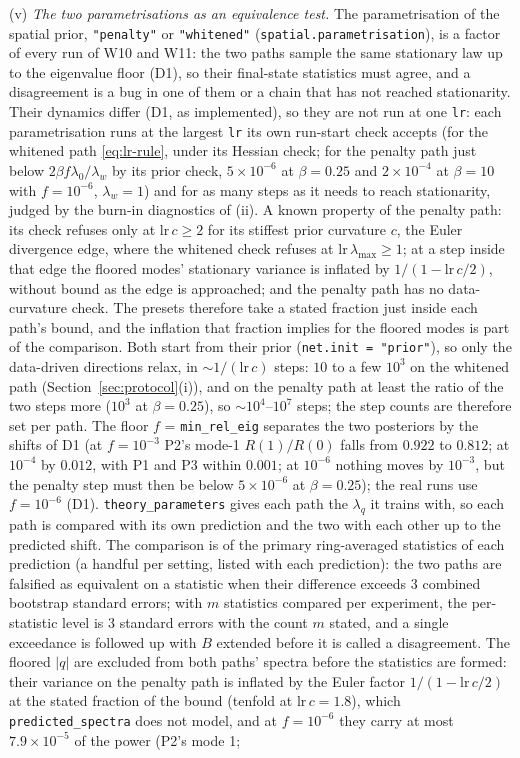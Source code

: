\documentclass[11pt,a4paper]{article}
\newcommand{\code}[1]{\texttt{#1}}
\begin{document}
(v) \emph{The two parametrisations as an equivalence test.} The parametrisation of the spatial prior, \code{"penalty"} or \code{"whitened"} (\code{spatial.parametrisation}), is a factor of every run of W10 and W11: the two paths sample the same stationary law up to the eigenvalue floor (D1), so their final-state statistics must agree, and a disagreement is a bug in one of them or a chain that has not reached stationarity. Their dynamics differ (D1, as implemented), so they are not run at one \code{lr}: each parametrisation runs at the largest \code{lr} its own run-start check accepts (for the whitened path \eqref{eq:lr-rule}, under its Hessian check; for the penalty path just below $2\beta f\lambda_0/\lambda_w$ by its prior check, $5\times10^{-6}$ at $\beta = 0.25$ and $2\times10^{-4}$ at $\beta = 10$ with $f = 10^{-6}$, $\lambda_w = 1$) and for as many steps as it needs to reach stationarity, judged by the burn-in diagnostics of (ii). A known property of the penalty path: its check refuses only at $\mathrm{lr}\,c\ge2$ for its stiffest prior curvature $c$, the Euler divergence edge, where the whitened check refuses at $\mathrm{lr}\,\lambda_{\max}\ge1$; at a step inside that edge the floored modes' stationary variance is inflated by $1/(1 - \mathrm{lr}\,c/2)$, without bound as the edge is approached; and the penalty path has no data-curvature check. The presets therefore take a stated fraction just inside each path's bound, and the inflation that fraction implies for the floored modes is part of the comparison. Both start from their prior (\code{net.init = "prior"}), so only the data-driven directions relax, in $\sim1/(\mathrm{lr}\,c)$ steps: $10$ to a few $10^3$ on the whitened path (Section~\ref{sec:protocol}(i)), and on the penalty path at least the ratio of the two steps more ($10^3$ at $\beta = 0.25$), so $\sim10^4$--$10^7$ steps; the step counts are therefore set per path. The floor $f$ = \code{min\_rel\_eig} separates the two posteriors by the shifts of D1 (at $f = 10^{-3}$ P2's mode-1 $R(1)/R(0)$ falls from $0.922$ to $0.812$; at $10^{-4}$ by $0.012$, with P1 and P3 within $0.001$; at $10^{-6}$ nothing moves by $10^{-3}$, but the penalty step must then be below $5\times10^{-6}$ at $\beta = 0.25$); the real runs use $f = 10^{-6}$ (D1). \code{theory\_parameters} gives each path the $\lambda_q$ it trains with, so each path is compared with its own prediction and the two with each other up to the predicted shift. The comparison is of the primary ring-averaged statistics of each prediction (a handful per setting, listed with each prediction): the two paths are falsified as equivalent on a statistic when their difference exceeds $3$ combined bootstrap standard errors; with $m$ statistics compared per experiment, the per-statistic level is $3$ standard errors with the count $m$ stated, and a single exceedance is followed up with $B$ extended before it is called a disagreement. The floored $|q|$ are excluded from both paths' spectra before the statistics are formed: their variance on the penalty path is inflated by the Euler factor $1/(1 - \mathrm{lr}\,c/2)$ at the stated fraction of the bound (tenfold at $\mathrm{lr}\,c = 1.8$), which \code{predicted\_spectra} does not model, and at $f = 10^{-6}$ they carry at most $7.9\times10^{-5}$ of the power (P2's mode 1; 
\end{document}

